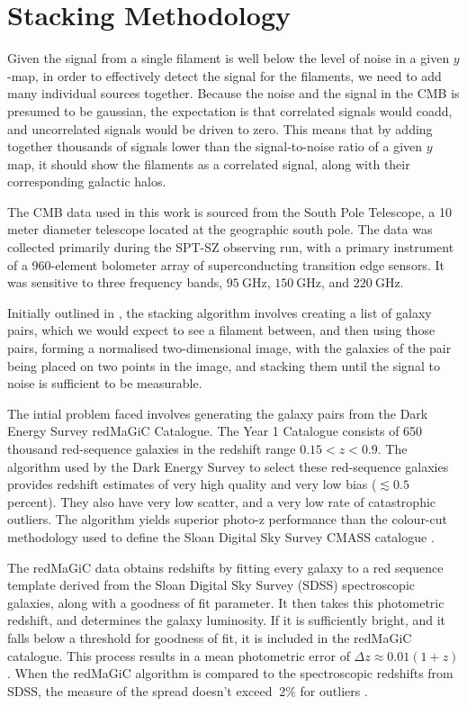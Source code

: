 
\chapter{Stacking Methodology}
Given the signal from a single filament is well below the level of noise in a given $y$-map, in order to effectively detect the signal for the filaments, we need to add many individual sources together. Because the noise and the signal in the CMB is presumed to be gaussian, the expectation is that correlated signals would coadd, and uncorrelated signals would be driven to zero. This means that by adding together thousands of signals lower than the signal-to-noise ratio of a given $y$ map, it should show the filaments as a correlated signal, along with their corresponding galactic halos.

\par The CMB data used in this work is sourced from the South Pole Telescope, a 10 meter diameter telescope located at the geographic south pole. The data was collected primarily during the SPT-SZ observing run, with a primary instrument of a 960-element bolometer array of superconducting transition edge sensors. It was sensitive to three frequency bands, $\SI{95}{\giga\hertz}$, $\SI{150}{\giga\hertz}$, and $\SI{220}{\giga\hertz}$. 

\par Initially outlined in \cite{2016MNRAS.457.2391C}, the stacking algorithm involves creating a list of galaxy pairs, which we would expect to see a filament between, and then using those pairs, forming a normalised two-dimensional image, with the galaxies of the pair being placed on two points in the image, and stacking them until the signal to noise is sufficient to be measurable.

\par The intial problem faced involves generating the galaxy pairs from the Dark Energy Survey redMaGiC Catalogue. The Year 1 Catalogue consists of 650 thousand red-sequence galaxies in the redshift range $0.15 < z < 0.9 $. The algorithm used by the Dark Energy Survey to select these red-sequence galaxies provides redshift estimates of very high quality and very low bias ($\lesssim 0.5$ percent). They also have very low scatter, and a very low rate of catastrophic outliers. The algorithm yields superior photo-z performance than the colour-cut methodology used to define the Sloan Digital Sky Survey CMASS catalogue \citep{2016MNRAS.461.1431R}. 

\par The redMaGiC data obtains redshifts by fitting every galaxy to a red sequence template derived from the Sloan Digital Sky Survey (SDSS) spectroscopic galaxies, along with a goodness of fit parameter. It then takes this photometric redshift, and determines the galaxy luminosity. If it is sufficiently bright, and it falls below a threshold for goodness of fit, it is included in the redMaGiC catalogue. This process results in a mean photometric error of $\Delta z \approx 0.01 (1+z) $. When the redMaGiC algorithm is compared to the spectroscopic redshifts from SDSS, the measure of the spread doesn't exceed $~2\%$ for outliers \citep{2016MNRAS.461.1431R}. 

